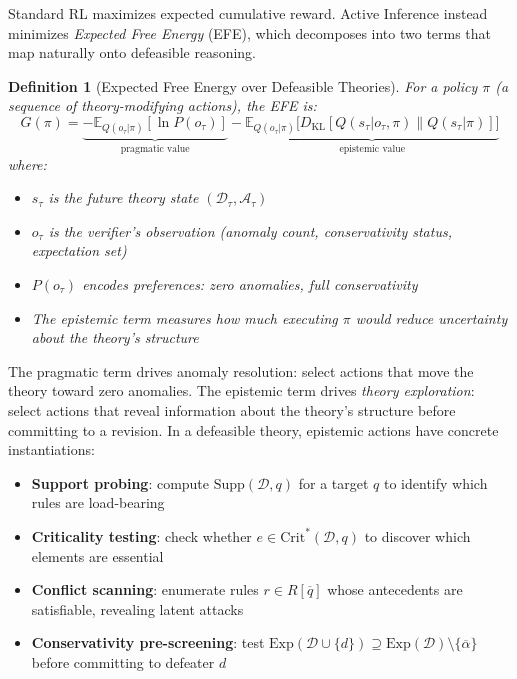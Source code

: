 \documentclass{article}
\newtheorem{definition}{Definition}
\newcommand{\D}{\mathcal{D}}
\newcommand{\Exp}{\mathrm{Exp}}
\newcommand{\comp}[1]{\overline{#1}}
\begin{document}
Standard RL maximizes expected cumulative reward. Active Inference instead minimizes \emph{Expected Free Energy} (EFE), which decomposes into two terms that map naturally onto defeasible reasoning.

\begin{definition}[Expected Free Energy over Defeasible Theories]
For a policy $\pi$ (a sequence of theory-modifying actions), the EFE is:
\[
    G(\pi) = \underbrace{-\mathbb{E}_{Q(o_\tau|\pi)}[\ln P(o_\tau)]}_{\text{pragmatic value}} - \underbrace{\mathbb{E}_{Q(o_\tau|\pi)}\bigl[D_{\mathrm{KL}}[Q(s_\tau|o_\tau,\pi) \| Q(s_\tau|\pi)]\bigr]}_{\text{epistemic value}}
\]
where:
\begin{itemize}[nosep]
    \item $s_\tau$ is the future theory state $(\D_\tau, \mathcal{A}_\tau)$
    \item $o_\tau$ is the verifier's observation (anomaly count, conservativity status, expectation set)
    \item $P(o_\tau)$ encodes preferences: zero anomalies, full conservativity
    \item The epistemic term measures how much executing $\pi$ would reduce uncertainty about the theory's structure
\end{itemize}
\end{definition}

The pragmatic term drives anomaly resolution: select actions that move the theory toward zero anomalies. The epistemic term drives \emph{theory exploration}: select actions that reveal information about the theory's structure before committing to a revision. In a defeasible theory, epistemic actions have concrete instantiations:

\begin{itemize}[nosep]
    \item \textbf{Support probing}: compute $\mathrm{Supp}(\D, q)$ for a target $q$ to identify which rules are load-bearing
    \item \textbf{Criticality testing}: check whether $e \in \mathrm{Crit}^*(\D, q)$ to discover which elements are essential
    \item \textbf{Conflict scanning}: enumerate rules $r \in R[\comp{q}]$ whose antecedents are satisfiable, revealing latent attacks
    \item \textbf{Conservativity pre-screening}: test $\Exp(\D \cup \{d\}) \supseteq \Exp(\D) \setminus \{\comp{\alpha}\}$ before committing to defeater $d$
\end{itemize}
\end{document}
